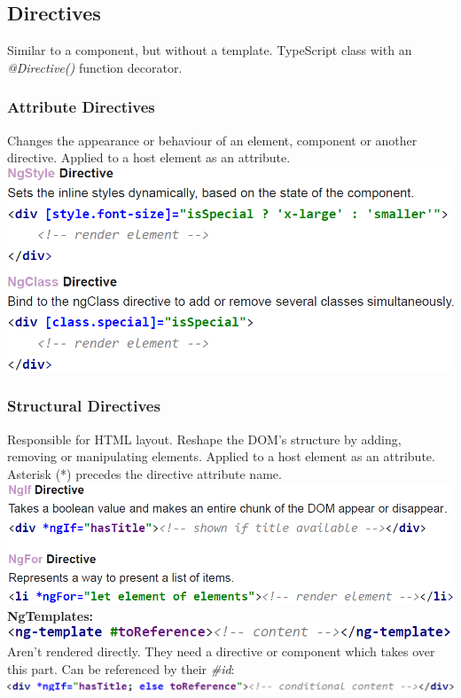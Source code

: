 \subsection{Directives}
Similar to a component, but without a template.
TypeScript class with an \textit{@Directive()} function decorator.
\subsubsection{Attribute Directives}
Changes the appearance or behaviour of an element, component or another directive.
Applied to a host element as an attribute.
\includegraphics[width=0.6\linewidth]{img/angular_attribute_directives.png}
\subsubsection{Structural Directives}
Responsible for HTML layout.
Reshape the DOM's structure by adding, removing or manipulating elements.
Applied to a host element as an attribute.
Asterisk (*) precedes the directive attribute name.\\
\includegraphics[width=0.7\linewidth]{img/angular_structural_directive.png}\\
\textbf{NgTemplates:}\\
\includegraphics[width=0.8\linewidth]{img/angular_ng_templates.png}\\
Aren't rendered directly.
They need a directive or component which takes over this part.
Can be referenced by their \textit{\#id}:\\
\includegraphics[width=0.8\linewidth]{img/angular_ng_templates2.png}

